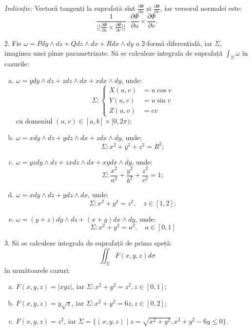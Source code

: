 \documentclass[11pt,a4paper]{article}
\theoremstyle{dotless}
\theoremstyle{dotlessdr}
\begin{document}
\emph{Indicație:} Vectorii tangenți la suprafață sînt $\frac{\partial \Phi}{\partial u}$ și
$\frac{\partial \Phi}{\partial v}$, iar versorul normalei este:
\[
  \frac{1}{\Big|\Big| \frac{\partial \Phi}{\partial u} \times \frac{\partial \Phi}{\partial v}\Big|\Big|}
    \cdot \frac{\partial \Phi}{\partial u} \times \frac{\partial \Phi}{\partial v}.
\]

\vspace{1cm}

2. Fie $\omega = Pdy \wedge dz + Qdz \wedge dx + Rdx \wedge dy$ o 2-formă diferențială,
iar $\Sigma$, imaginea unei pînze parametrizate. Să se calculeze integrala de
suprafață $\int_\Sigma \omega$ în cazurile:
\begin{enumerate}[(a)]
\item $\omega = ydy \wedge dz + zdz \wedge dx + xdx \wedge dy$, unde:
  \[
    \Sigma : \begin{cases}
      X(u, v) &= u \cos v \\
      Y(u, v) &= u \sin v \\
      Z(u, v) &= cv
    \end{cases}
  \]
  cu domeniul $(u, v) \in [a, b] \times [0, 2\pi)$;
\item $\omega = xdy \wedge dz + ydz \wedge dx + zdx \wedge dy$, unde:
  \[
    \Sigma : x^2 + y^2 + z^2 = R^2;
  \]
\item $\omega = yzdy \wedge dz + zxdz \wedge dx + xydx \wedge dy$, unde:
  \[
    \Sigma : \frac{x^2}{a^2} + \frac{y^2}{b^2} + \frac{z^2}{c^2} = 1;
  \]
\item $\omega = xdy \wedge dz + ydz \wedge dx$, unde:
  \[
    \Sigma: x^2 + y^2 = z^2, \quad z \in [1,2];
  \]
\item $\omega = (y + z) dy \wedge dz + (x + y) dx \wedge dy$, unde:
  \[
    \Sigma: x^2 + y^2 = a^2, \quad a \in [0, 1]
  \]
\end{enumerate}

\vspace{1cm}

3. Să se calculeze integrala de suprafață de prima speță:
\[
  \iint_\Sigma F(x, y, z) d\sigma
\]
în următoarele cazuri:
\begin{enumerate}[(a)]
\item $F(x, y, z) = |xyz|$, iar $\Sigma: x^2 + y^2 = z^2, z \in [0, 1]$;
\item $F(x, y, z) = y\sqrt{z}$, iar $\Sigma: x^2 + y^2 = 6z, z \in [0, 2]$;
\item $F(x, y, z) = z^2$, iar $\Sigma = \{(x, y, z) \mid z = \sqrt{x^2 + y^2}, %
  x^2 + y^2 - 6y \leq 0 \}$.
\end{enumerate}
\end{document}
